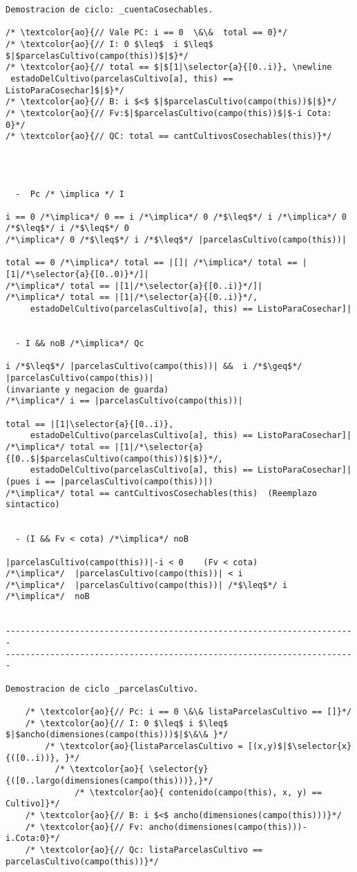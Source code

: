 \begin{lstlisting}
Demostracion de ciclo: _cuentaCosechables.

/* \textcolor{ao}{// Vale PC: i == 0  \&\&  total == 0}*/
/* \textcolor{ao}{// I: 0 $\leq$  i $\leq$ $|$parcelasCultivo(campo(this))$|$}*/
/* \textcolor{ao}{// total == $|$[1|\selector{a}{[0..i)}, \newline
 estadoDelCultivo(parcelasCultivo[a], this) == ListoParaCosechar]$|$}*/
/* \textcolor{ao}{// B: i $<$ $|$parcelasCultivo(campo(this))$|$}*/
/* \textcolor{ao}{// Fv:$|$parcelasCultivo(campo(this))$|$-i Cota: 0}*/
/* \textcolor{ao}{// QC: total == cantCultivosCosechables(this)}*/    




  -  Pc /* \implica */ I
  
i == 0 /*\implica*/ 0 == i /*\implica*/ 0 /*$\leq$*/ i /*\implica*/ 0 /*$\leq$*/ i /*$\leq$*/ 0 
/*\implica*/ 0 /*$\leq$*/ i /*$\leq$*/ |parcelasCultivo(campo(this))|

total == 0 /*\implica*/ total == |[]| /*\implica*/ total == |[1|/*\selector{a}{[0..0)}*/]|
/*\implica*/ total == |[1|/*\selector{a}{[0..i)}*/]| 
/*\implica*/ total == |[1|/*\selector{a}{[0..i)}*/, 
     estadoDelCultivo(parcelasCultivo[a], this) == ListoParaCosechar]|


  - I && noB /*\implica*/ Qc
  
i /*$\leq$*/ |parcelasCultivo(campo(this))| &&  i /*$\geq$*/ |parcelasCultivo(campo(this))| 
(invariante y negacion de guarda)
/*\implica*/ i == |parcelasCultivo(campo(this))|

total == |[1|\selector{a}{[0..i)}, 
     estadoDelCultivo(parcelasCultivo[a], this) == ListoParaCosechar]|
/*\implica*/ total == |[1|/*\selector{a}{[0..$|$parcelasCultivo(campo(this))$|$)}*/,
     estadoDelCultivo(parcelasCultivo[a], this) == ListoParaCosechar]|
(pues i == |parcelasCultivo(campo(this))|)
/*\implica*/ total == cantCultivosCosechables(this)  (Reemplazo sintactico)


  - (I && Fv < cota) /*\implica*/ noB

|parcelasCultivo(campo(this))|-i < 0    (Fv < cota)
/*\implica*/  |parcelasCultivo(campo(this))| < i    
/*\implica*/  |parcelasCultivo(campo(this))| /*$\leq$*/ i
/*\implica*/  noB


-----------------------------------------------------------------------
-----------------------------------------------------------------------

Demostracion de ciclo _parcelasCultivo.

    /* \textcolor{ao}{// Pc: i == 0 \&\& listaParcelasCultivo == []}*/        
  	/* \textcolor{ao}{// I: 0 $\leq$ i $\leq$ $|$ancho(dimensiones(campo(this)))$|$\&\& }*/
    	/* \textcolor{ao}{listaParcelasCultivo = [(x,y)$|$\selector{x}{([0..i))}, }*/		
  		  /* \textcolor{ao}{ \selector{y}{([0..largo(dimensiones(campo(this)))},}*/		
    		  /* \textcolor{ao}{ contenido(campo(this), x, y) == Cultivo]}*/
    /* \textcolor{ao}{// B: i $<$ ancho(dimensiones(campo(this)))}*/
    /* \textcolor{ao}{// Fv: ancho(dimensiones(campo(this)))-i.Cota:0}*/
    /* \textcolor{ao}{// Qc: listaParcelasCultivo == parcelasCultivo(campo(this))}*/    



\end{lstlisting}
